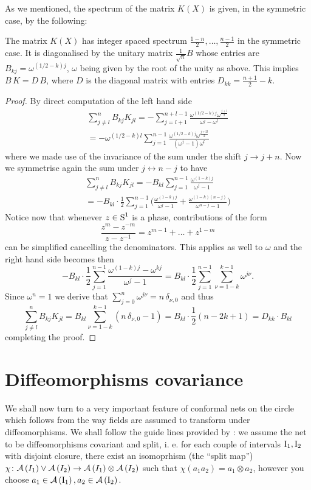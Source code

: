  \bigskip
 As we mentioned, the spectrum of the matrix $K(X)$ is 
 given, in the symmetric case, by the following:
 \begin{lemma}
 The matrix $K(X)$ has integer spaced spectrum 
 $\frac{1-n}{2},\ldots,\frac{n-1}{2}$ in the symmetric
 case. It is diagonalised by the unitary matrix 
 $\frac{1}{\sqrt{n}}B$ whose entries are 
 $B_{kj}=\omega^{(1/2-k)j}$, $\omega$ being given
 by the root of the unity as above. This implies 
 $B\,K=D\,B$, where $D$ is the diagonal matrix
 with entries $D_{kk}=\frac{n+1}{2}-k$.
 \end{lemma}
 \begin{proof}
 By direct computation of the left hand side 
 \begin{multline*}
 \sum_{j\neq l}^n B_{kj}K_{jl}=-
 \sum_{j=l+1}^{n+l-1}\frac{\omega^{(1/2-k)j}
 \omega^{\frac{j+l}{2}}}{\omega^j-\omega^l}\\
 =-\omega^{(1/2-k)l}\sum_{j=1}^{n-1}
 \frac{\omega^{(1/2-k)j}\omega^{\frac{j+2l}{2}}}{(\omega^j-1)\omega^l}
 \end{multline*}
 where we made use of the invariance of the sum under 
 the shift $j\to j+n$. Now we symmetrise again the 
 sum under $j\leftrightarrow n-j$ to have 
 \begin{multline*}
 \sum_{j\neq l}^n B_{kj}K_{jl}=
 -B_{kl}\sum_{j=1}^{n-1}\frac{\omega^{(1-k)j}}{\omega^j-1}\\
 =-B_{kl}\cdot \frac{1}{2}\sum_{j=1}^{n-1}
 \Big(\frac{\omega^{(1-k)j}}{\omega^j-1}+
 \frac{\omega^{(1-k)(n-j)}}{\omega^{n-j}-1}\Big)
 \end{multline*} 
 \noindent Notice now that whenever $z\in\textrm{S}^1$ 
 is a phase, contributions of the form 
 \[
 \frac{z^m-z^{-m}}{z-z^{-1}}=z^{m-1}+\ldots 
 +z^{1-m}
 \]
 can be simplified cancelling the denominators. 
 This applies as well to $\omega$ and the 
 right hand side becomes then 
 \[
 -B_{kl}\cdot\frac{1}{2}\sum_{j=1}^{n-1}
 \frac{\omega^{(1-k)j}-\omega^{kj}}{\omega^j-1}
 =B_{kl}\cdot\frac{1}{2}\sum_{j=1}^{n-1}
 \sum_{\nu=1-k}^{k-1}\omega^{j\nu}.
 \]
 Since $\omega^n=1$ we derive that 
 $\sum_{j=0}^n\omega^{j\nu}=n\,\delta_{\nu,0}$
 and thus 
 \[
 \sum_{j\neq l}^n B_{kj}K_{jl}=
 B_{kl}\sum_{\nu=1-k}^{k-1}(n\,\delta_{\nu,0}-1)
 =B_{kl}\cdot\frac{1}{2}(n-2k+1)=D_{kk}\cdot B_{kl}
 \]
 completing the proof.
 \end{proof}


 
 \section{Diffeomorphisms covariance}
 \label{Longo-Xu}
 We shall now turn to a very important feature 
 of conformal nets on the circle which follows 
 from the way fields are assumed to transform 
 under diffeomorphisms. We shall follow the guide 
 lines provided by \cite{LX:2004}: we assume the net
 to be diffeomorphisms covariant and split, i. e.
 for each couple of intervals $\textrm{I}_1,\textrm{I}_2$ with 
 disjoint closure, there exist an isomoprhism 
 (the ``split map'') $\chi\colon\mathcal{A}\left(I_1\right)\vee
 \mathcal{A}\left(I_2\right)\to\mathcal{A}\left(I_1\right)\otimes\mathcal{A}\left(I_2\right)$ such that
 $\chi(a_1 a_2)=a_1\otimes a_2$, however you choose
 $a_1\in \mathcal{A}\left(\textrm{I}_1\right),a_2\in\mathcal{A}\left(\textrm{I}_2\right)$.
 
